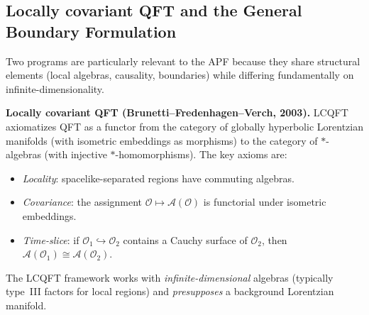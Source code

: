 \documentclass[11pt]{article}
\theoremstyle{definition}
\begin{document}
\subsection{Locally covariant QFT and the General Boundary Formulation}
\label{sec:lcqft_oeckl}

Two programs are particularly relevant to the APF because they
share structural elements (local algebras, causality, boundaries)
while differing fundamentally on infinite-dimensionality.

\smallskip\noindent\textbf{Locally covariant QFT
(Brunetti--Fredenhagen--Verch, 2003).}\quad
LCQFT axiomatizes QFT as a functor from the category of globally
hyperbolic Lorentzian manifolds (with isometric embeddings as morphisms)
to the category of $*$-algebras (with injective $*$-homomorphisms).
The key axioms are:
\begin{itemize}[nosep]
  \item \textit{Locality}: spacelike-separated regions have commuting
  algebras.
  \item \textit{Covariance}: the assignment $\mathcal{O} \mapsto
  \mathcal{A}(\mathcal{O})$ is functorial under isometric embeddings.
  \item \textit{Time-slice}: if $\mathcal{O}_1 \hookrightarrow
  \mathcal{O}_2$ contains a Cauchy surface of $\mathcal{O}_2$, then
  $\mathcal{A}(\mathcal{O}_1) \cong \mathcal{A}(\mathcal{O}_2)$.
\end{itemize}
The LCQFT framework works with \emph{infinite-dimensional} algebras
(typically type~III factors for local regions) and
\emph{presupposes} a background Lorentzian manifold.
\end{document}
